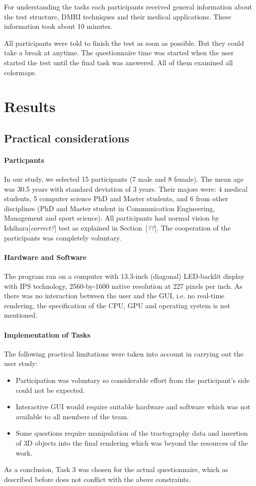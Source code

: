 \documentclass[a4paper, 12pt]{report}
\newcommand{\comment}[1]{{\color{red}[\textit{#1}]}}
\begin{document}
For understanding the tasks each participants received general information about the test structure, DMRI techniques and their medical applications. These information took about 10 minutes. 

All participants were told to finish the test as soon as possible. But they could take a break at anytime. The questionnaire time was started when the user started the test until the final task was answered. 
All of them examined all colormaps.

\section{Results}
\subsection{Practical considerations }
\paragraph{Particpants} In our study, we selected 15 participants (7 male and 8 female). The  mean age was 30.5 years with standard deviation of 3 years. Their majors were: 4 medical students, 5 computer science PhD and Master students, and 6 from other disciplines (PhD and Master student in Communication Engineering, Management and sport science). All participants had normal vision by Ishihara\comment{correct?} test as explained in Section~\comment{??}. The cooperation of the participants was completely voluntary.

\paragraph{Hardware and Software} The program ran on a computer with 13.3-inch (diagonal) LED-backlit display with IPS technology, 2560-by-1600 native resolution at 227 pixels per inch. As there was no interaction between the user and the GUI, i.e. no real-time rendering, the specification of the CPU, GPU and operating system is not mentioned. 

\paragraph{Implementation of Tasks} The following practical limitations were taken into account in carrying out the user study:
\begin{itemize}
	\item Participation was voluntary so considerable effort from the participant's side could not be expected.
	\item Interactive GUI would require suitable hardware and software which was not available to all members of the team.
	\item Some questions require manipulation of the tractography data and insertion of 3D objects into the final rendering which was beyond the resources of the work.
\end{itemize}
As a conclusion, Task 3 was chosen for the actual questionnaire, which as described before does not conflict with the above constraints.
\end{document}

